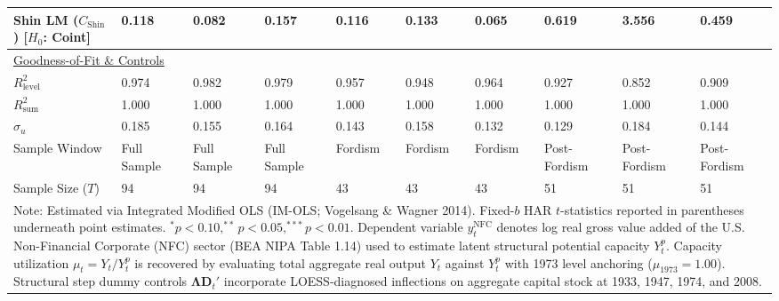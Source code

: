 \begin{landscape}
\begin{table}[H]
\begin{tabular}{p{4.8cm}p{1.8cm}p{1.8cm}p{1.8cm}p{1.8cm}p{1.8cm}p{1.8cm}p{1.8cm}p{1.8cm}p{1.8cm}}
Shin LM ($C_{\text{Shin}}$) [$H_0$: Coint] & 0.118 & 0.082 & 0.157 & 0.116 & 0.133 & 0.065 & 0.619 & 3.556 & 0.459  \\
\midrule
\multicolumn{10}{l}{\underline{Goodness-of-Fit \& Controls}} \\
$R_{\text{level}}^2$ & 0.974 & 0.982 & 0.979 & 0.957 & 0.948 & 0.964 & 0.927 & 0.852 & 0.909  \\
$R_{\text{sum}}^2$ & 1.000 & 1.000 & 1.000 & 1.000 & 1.000 & 1.000 & 1.000 & 1.000 & 1.000  \\
$\hat{\sigma}_u$ & 0.185 & 0.155 & 0.164 & 0.143 & 0.158 & 0.132 & 0.129 & 0.184 & 0.144  \\
Sample Window & Full Sample & Full Sample & Full Sample & Fordism & Fordism & Fordism & Post-Fordism & Post-Fordism & Post-Fordism  \\
Sample Size ($T$) & 94 & 94 & 94 & 43 & 43 & 43 & 51 & 51 & 51  \\
\bottomrule
\multicolumn{10}{p{19.5cm}}{\footnotesize Note: Estimated via Integrated Modified OLS (IM-OLS; Vogelsang \& Wagner 2014). Fixed-$b$ HAR $t$-statistics reported in parentheses underneath point estimates. $^*p<0.10, ^{**}p<0.05, ^{***}p<0.01$. Dependent variable $y_t^{\text{NFC}}$ denotes log real gross value added of the U.S. Non-Financial Corporate (NFC) sector (BEA NIPA Table 1.14) used to estimate latent structural potential capacity $Y_t^p$. Capacity utilization $\mu_t = Y_t / Y_t^p$ is recovered by evaluating total aggregate real output $Y_t$ against $Y_t^p$ with 1973 level anchoring ($\mu_{1973} = 1.00$). Structural step dummy controls $\boldsymbol{\Lambda} \mathbf{D}_t'$ incorporate LOESS-diagnosed inflections on aggregate capital stock at 1933, 1947, 1974, and 2008.}
\end{tabular}
\end{table}
\end{landscape}
